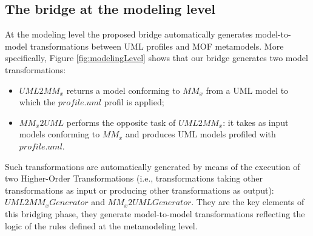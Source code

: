 


\subsection{The bridge at the modeling level}\label{sec:modeLevel}

At the modeling level the proposed bridge automatically generates model-to-model transformations between UML profiles and MOF metamodels.
More specifically, Figure \ref{fig:modelingLevel} shows that our bridge generates two model transformations:
%
\begin{itemize}
	\item $UML2MM_x$ returns a model conforming to $MM_x$ from a UML model to which the $profile.uml$ profil is applied; 
	\item $MM_x2UML$ performs the opposite task of $UML2MM_x$: it takes as input models conforming to $MM_x$ 
	and produces UML models profiled with $profile.uml$.
\end{itemize}
%

Such transformations are automatically generated by means of the execution of two Higher-Order Transformations
(i.e., transformations taking other transformations as input or producing
other transformations as output): $UML2MM_xGenerator$ and $MM_x2UMLGenerator$.
They are the key elements of this bridging phase, they generate model-to-model transformations
reflecting the logic of the rules defined at the metamodeling level. 

